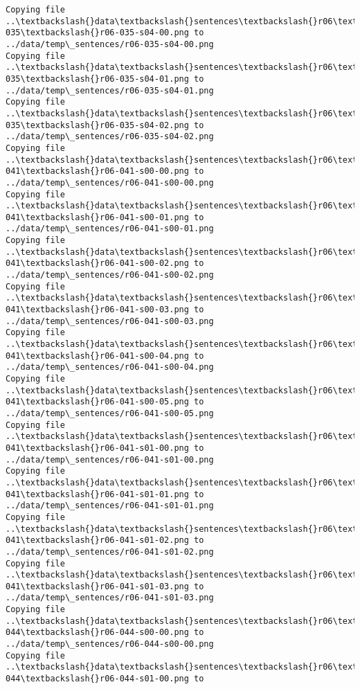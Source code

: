 \documentclass[11pt]{article}
\begin{document}
\begin{Verbatim}[commandchars=\\\{\}]
Copying file ..\textbackslash{}data\textbackslash{}sentences\textbackslash{}r06\textbackslash{}r06-035\textbackslash{}r06-035-s04-00.png to
../data/temp\_sentences/r06-035-s04-00.png
Copying file ..\textbackslash{}data\textbackslash{}sentences\textbackslash{}r06\textbackslash{}r06-035\textbackslash{}r06-035-s04-01.png to
../data/temp\_sentences/r06-035-s04-01.png
Copying file ..\textbackslash{}data\textbackslash{}sentences\textbackslash{}r06\textbackslash{}r06-035\textbackslash{}r06-035-s04-02.png to
../data/temp\_sentences/r06-035-s04-02.png
Copying file ..\textbackslash{}data\textbackslash{}sentences\textbackslash{}r06\textbackslash{}r06-041\textbackslash{}r06-041-s00-00.png to
../data/temp\_sentences/r06-041-s00-00.png
Copying file ..\textbackslash{}data\textbackslash{}sentences\textbackslash{}r06\textbackslash{}r06-041\textbackslash{}r06-041-s00-01.png to
../data/temp\_sentences/r06-041-s00-01.png
Copying file ..\textbackslash{}data\textbackslash{}sentences\textbackslash{}r06\textbackslash{}r06-041\textbackslash{}r06-041-s00-02.png to
../data/temp\_sentences/r06-041-s00-02.png
Copying file ..\textbackslash{}data\textbackslash{}sentences\textbackslash{}r06\textbackslash{}r06-041\textbackslash{}r06-041-s00-03.png to
../data/temp\_sentences/r06-041-s00-03.png
Copying file ..\textbackslash{}data\textbackslash{}sentences\textbackslash{}r06\textbackslash{}r06-041\textbackslash{}r06-041-s00-04.png to
../data/temp\_sentences/r06-041-s00-04.png
Copying file ..\textbackslash{}data\textbackslash{}sentences\textbackslash{}r06\textbackslash{}r06-041\textbackslash{}r06-041-s00-05.png to
../data/temp\_sentences/r06-041-s00-05.png
Copying file ..\textbackslash{}data\textbackslash{}sentences\textbackslash{}r06\textbackslash{}r06-041\textbackslash{}r06-041-s01-00.png to
../data/temp\_sentences/r06-041-s01-00.png
Copying file ..\textbackslash{}data\textbackslash{}sentences\textbackslash{}r06\textbackslash{}r06-041\textbackslash{}r06-041-s01-01.png to
../data/temp\_sentences/r06-041-s01-01.png
Copying file ..\textbackslash{}data\textbackslash{}sentences\textbackslash{}r06\textbackslash{}r06-041\textbackslash{}r06-041-s01-02.png to
../data/temp\_sentences/r06-041-s01-02.png
Copying file ..\textbackslash{}data\textbackslash{}sentences\textbackslash{}r06\textbackslash{}r06-041\textbackslash{}r06-041-s01-03.png to
../data/temp\_sentences/r06-041-s01-03.png
Copying file ..\textbackslash{}data\textbackslash{}sentences\textbackslash{}r06\textbackslash{}r06-044\textbackslash{}r06-044-s00-00.png to
../data/temp\_sentences/r06-044-s00-00.png
Copying file ..\textbackslash{}data\textbackslash{}sentences\textbackslash{}r06\textbackslash{}r06-044\textbackslash{}r06-044-s01-00.png to

\end{Verbatim}
\end{document}
